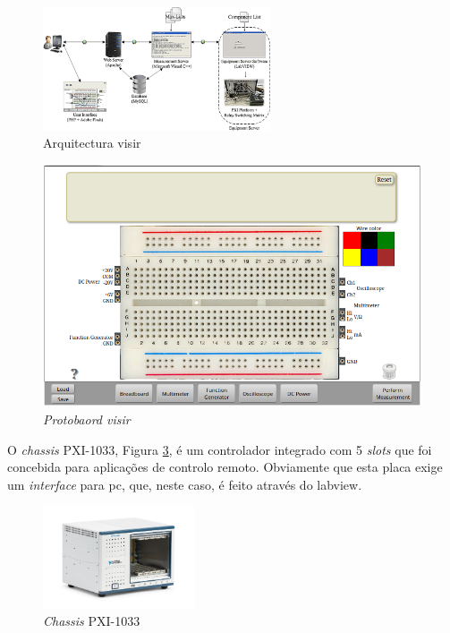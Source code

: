 \begin{figure}[hbtp]
    \centering
    \includegraphics[width=0.6\textwidth]{figures/arquitectura_VISIR.png}
    \caption{Arquitectura \acrshort{visir}\cite{tawfikexperiences}}
    \label{fig:arquitecturavisir}
\end{figure}

\begin{figure}[hbtp]
    \centering
    \includegraphics[width=0.4\linewidth]{figures/protboard_visir.png}
    \caption{\textit{Protobaord \acrshort{visir}}}
    \label{fig:protboard_visir}
\end{figure}

O \textit{chassis}  PXI-1033\cite{PXI-1033}, Figura \ref{fig:PXI-1033}, é um controlador integrado com 5 \textit{slots} que foi concebida para aplicações de controlo remoto. Obviamente que esta placa exige um \textit{interface} para \acrshort{pc}, que, neste caso, é feito através do \acrshort{labview}.

\begin{figure}[hbtp]
    \centering
    \includegraphics[width=0.4\textwidth]{figures/PXI-1033.png}
    \caption{\textit{Chassis} PXI-1033 \cite{PXI-1033}}
    \label{fig:PXI-1033}
\end{figure}

